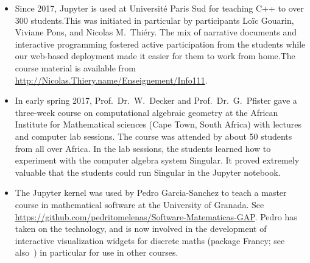 \begin{Aim 1}
\begin{Aim 2}
\begin{itemize}
    5 participants installed a source version of Sage for the first time (so that they could edit the source).
    3 used git for the first time.
    5 used git within Sage for the first time.
    11 got their first Trac account .
    5 got their first contribution to a Sage ticket.
    8 are in the process of getting their first code integrated to Sage.

We worked on 14 tickets during the week, 6 of those which have been merged since the conference. All participants said they had learned new 
things and it would impact their careers. %

\subsection{Teaching}\label{teaching}
We showcase here a few of the many uses in teaching of the Jupyter kernels we contributed to:

     \item Since 2017, Jupyter is used at Université Paris Sud for teaching C++ to over 300 students.This was initiated in particular by
     \ODK participants Loïc Gouarin, Viviane Pons, and Nicolas M.\ Thiéry. The mix of narrative documents and interactive programming 
     fostered active participation from the students while our web-based deployment made it easier for them to work from home.The course 
     material is available from \url{http://Nicolas.Thiery.name/Enseignement/Info111}.
     
     \item In early spring 2017, Prof.~Dr.~W.~Decker and Prof.~Dr.~G.~Pfister gave a three-week course on computational algebraic geometry 
     at the African Institute for Mathematical sciences (Cape Town, South Africa) with lectures and computer lab sessions.
     The course was attended by about 50 students from all over Africa. In the lab sessions, the students learned how to experiment with the
     computer algebra system Singular. It proved extremely valuable that the students could run Singular in the Jupyter notebook.
     
     \item The \GAP Jupyter kernel was used by Pedro Garcia-Sanchez to teach a master course in mathematical software at the University of
     Granada. See  \url{https://github.com/pedritomelenas/Software-Matematicas-GAP}. Pedro has taken on the technology, and is now involved
     in the   development of interactive visualization widgets for discrete maths (package Francy; see also~) in particular for use in other courses.
     

\end{itemize}
\end{Aim 2}
\end{Aim 1}
